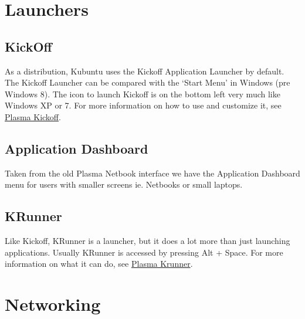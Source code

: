 \documentclass[letterpaper,10pt,english]{sphinxmanual}
\begin{document}
\section{Launchers}
\label{\detokenize{docs/basic:launchers}}

\subsection{KickOff}
\label{\detokenize{docs/basic:kickoff}}
\noindent{}

As a  distribution, Kubuntu uses the Kickoff Application Launcher by default. The Kickoff Launcher can be compared with the `Start Menu' in Windows (pre Windows 8). The icon to launch Kickoff is on the bottom left very much like Windows XP or 7. For more information on how to use and customize it, see \href{https://userbase.kde.org/Special:MyLanguage/Plasma/Kickoff}{Plasma Kickoff}.


\subsection{Application Dashboard}
\label{\detokenize{docs/basic:application-dashboard}}
\noindent{}

Taken from the old Plasma Netbook interface we have the Application Dashboard menu for users with smaller screens ie. Netbooks or small laptops.


\subsection{KRunner}
\label{\detokenize{docs/basic:krunner}}

Like Kickoff, KRunner is a launcher, but it does a lot more than just launching applications. Usually KRunner is accessed by pressing Alt + Space. For more information on what it can do, see \href{https://userbase.kde.org/Special:MyLanguage/Plasma/Krunner}{Plasma Krunner}.


\section{Networking}
\label{\detokenize{docs/basic:networking}}
\noindent{}
\end{document}
